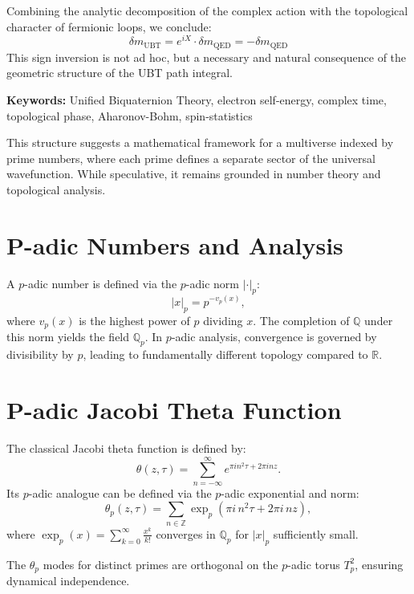 \documentclass[12pt,a4paper]{article}
\numberwithin{equation}{section}
\theoremstyle{definition}
\theoremstyle{remark}
\begin{document}
Combining the analytic decomposition of the complex action with the topological character of fermionic loops, we conclude:
\[
\delta m_{\text{UBT}} = e^{iX} \cdot \delta m_{\text{QED}} = -\delta m_{\text{QED}}
\]
This sign inversion is not ad hoc, but a necessary and natural consequence of the geometric structure of the UBT path integral.

\bigskip
\noindent\textbf{Keywords:} Unified Biquaternion Theory, electron self-energy, complex time, topological phase, Aharonov-Bohm, spin-statistics


This structure suggests a mathematical framework for a multiverse indexed by prime numbers, where each prime defines a separate sector of the universal wavefunction. While speculative, it remains grounded in number theory and topological analysis.

\section{P-adic Numbers and Analysis}
A $p$-adic number is defined via the $p$-adic norm $|\cdot|_p$:
\begin{equation}
|x|_p = p^{-v_p(x)},
\end{equation}
where $v_p(x)$ is the highest power of $p$ dividing $x$. The completion of $\mathbb{Q}$ under this norm yields the field $\mathbb{Q}_p$.
In $p$-adic analysis, convergence is governed by divisibility by $p$, leading to fundamentally different topology compared to $\mathbb{R}$.

\section{P-adic Jacobi Theta Function}
The classical Jacobi theta function is defined by:
\begin{equation}
\theta(z,\tau) = \sum_{n=-\infty}^\infty e^{\pi i n^2 \tau + 2\pi i n z}.
\end{equation}
Its $p$-adic analogue can be defined via the $p$-adic exponential and norm:
\begin{equation}
\theta_p(z,\tau) = \sum_{n \in \mathbb{Z}} \exp_p\!\left(\pi i\, n^2 \tau + 2\pi i\, n z \right),
\end{equation}
where $\exp_p(x) = \sum_{k=0}^\infty \frac{x^k}{k!}$ converges in $\mathbb{Q}_p$ for $|x|_p$ sufficiently small.

The $\theta_p$ modes for distinct primes are orthogonal on the $p$-adic torus $T_p^2$, ensuring dynamical independence.
\end{document}
